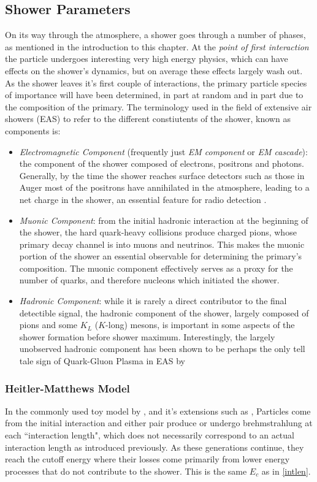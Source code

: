 \subsection{Shower Parameters}%
On its way through the atmosphere, a shower goes through a number of phases, as mentioned in the introduction to this chapter. At the \textit{point of first interaction} the particle undergoes interesting very high energy physics, which can have effects on the shower's dynamics, but on average these effects largely wash out. As the shower leaves it's first couple of interactions, the primary particle species of importance will have been determined, in part at random and in part due to the composition of the primary. The terminology used in the field of extensive air showers (EAS) to refer to the different constiutents of the shower, known as components is:
\begin{itemize}
\item \textit{Electromagnetic Component} (frequently just \textit{EM component} or \textit{EM cascade}): the component of the shower composed of electrons, positrons and photons. Generally, by the time the shower reaches surface detectors such as those in Auger most of the positrons have annihilated in the atmosphere, leading to a net charge in the shower, an essential feature for radio detection \cite{schroeder}.
\item \textit{Muonic Component}: from the initial hadronic interaction at the beginning of the shower, the hard quark-heavy collisions produce charged pions, whose primary decay channel is into muons and neutrinos. This makes the muonic portion of the shower an essential observable for determining the primary's composition. The muonic component effectively serves as a proxy for the number of quarks, and therefore nucleons which initiated the shower.
\item \textit{Hadronic Component}: while it is rarely a direct contributor to the final detectible signal, the hadronic component of the shower, largely composed of pions and some $K_L$ ($K$-long) mesons, is important in some aspects of the shower formation before shower maximum. Interestingly, the largely unobserved hadronic component has been shown to be perhaps the only tell tale sign of Quark-Gluon Plasma in EAS by \textcite{danielle}
\end{itemize}

\subsubsection{Heitler-Matthews Model}
In the commonly used toy model by \textcite{heitler}, and it's extensions such as \cite{matthews}, Particles come from the initial interaction and either pair produce or undergo brehmstrahlung at each ``interaction length", which does not necessarily correspond to an actual interaction length as introduced previously. As these generations continue, they reach the cutoff energy where their losses come primarily from lower energy processes that do not contribute to the shower. This is the same $E_c$ as in \autoref{intlen}.

